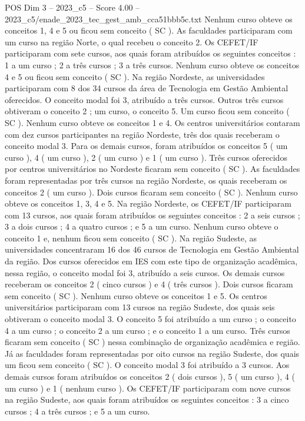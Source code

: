 \begin{textsample}{POS Dim 3 – 2023\_c5 – Score 4.00 – 2023\_c5/enade\_2023\_tec\_gest\_amb\_cca51bbb5c.txt}
Nenhum curso obteve os conceitos 1, 4 e 5 ou ficou sem conceito ( SC ).
As faculdades participaram com um curso na região Norte, o qual recebeu o conceito 2.
Os CEFET/IF participaram com sete cursos, aos quais foram atribuídos os seguintes conceitos : 1 a um curso ; 2 a três cursos ; 3 a três cursos.
Nenhum curso obteve os conceitos 4 e 5 ou ficou sem conceito ( SC ).
Na região Nordeste, as universidades participaram com 8 dos 34 cursos da área de Tecnologia em Gestão Ambiental oferecidos.
O conceito modal foi 3, atribuído a três cursos.
Outros três cursos obtiveram o conceito 2 ; um curso, o conceito 5.
Um curso ficou sem conceito ( SC ).
Nenhum curso obteve os conceitos 1 e 4.
Os centros universitários contaram com dez cursos participantes na região Nordeste, três dos quais receberam o conceito modal 3.
Para os demais cursos, foram atribuídos os conceitos 5 ( um curso ), 4 ( um curso ), 2 ( um curso ) e 1 ( um curso ).
Três cursos oferecidos por centros universitários no Nordeste ficaram sem conceito ( SC ).
As faculdades foram representadas por três cursos na região Nordeste, os quais receberam os conceitos 2 ( um curso ).
Dois cursos ficaram sem conceito ( SC ).
Nenhum curso obteve os conceitos 1, 3, 4 e 5.
Na região Nordeste, os CEFET/IF participaram com 13 cursos, aos quais foram atribuídos os seguintes conceitos : 2 a seis cursos ; 3 a dois cursos ; 4 a quatro cursos ; e 5 a um curso.
Nenhum curso obteve o conceito 1 e, nenhum ficou sem conceito ( SC ).
Na região Sudeste, as universidades concentraram 16 dos 46 cursos de Tecnologia em Gestão Ambiental da região.
Dos cursos oferecidos em IES com este tipo de organização acadêmica, nessa região, o conceito modal foi 3, atribuído a seis cursos.
Os demais cursos receberam os conceitos 2 ( cinco cursos ) e 4 ( três cursos ).
Dois cursos ficaram sem conceito ( SC ).
Nenhum curso obteve os conceitos 1 e 5.
Os centros universitários participaram com 13 cursos na região Sudeste, dos quais seis obtiveram o conceito modal 3.
O conceito 5 foi atribuído a um curso ; o conceito 4 a um curso ; o conceito 2 a um curso ; e o conceito 1 a um curso.
Três cursos ficaram sem conceito ( SC ) nessa combinação de organização acadêmica e região.
Já as faculdades foram representadas por oito cursos na região Sudeste, dos quais um ficou sem conceito ( SC ).
O conceito modal 3 foi atribuído a 3 cursos.
Aos demais cursos foram atribuídos os conceitos 2 ( dois cursos ), 5 ( um curso ), 4 ( um curso ) e 1 ( nenhum curso ).
Os CEFET/IF participaram com nove cursos na região Sudeste, aos quais foram atribuídos os seguintes conceitos : 3 a cinco cursos ; 4 a três cursos ; e 5 a um curso.

\end{textsample}
